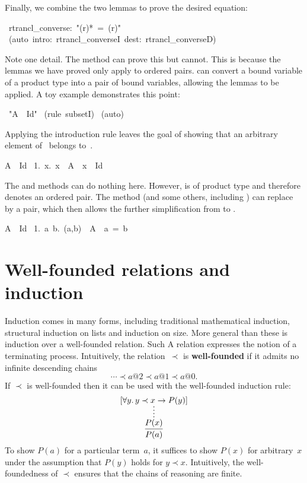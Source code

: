 Finally, we combine the two lemmas to prove the desired equation: 
\begin{isabelle}
\ rtrancl_converse:\ "(r){\isacharcircum}*\ =\ (r\isacharcircum{*}){\isacharcircum}"\isanewline
{}\ (auto\ intro:\
rtrancl_converseI\ dest:\
rtrancl_converseD)\isanewline
{}
\end{isabelle}

Note one detail. The {} method can prove this but
{} cannot. 
This is because the
lemmas we have proved only apply  to ordered pairs. {} can
convert a bound variable of  a product type into a pair of bound variables,
allowing the lemmas  to be applied.  A toy example demonstrates this
point:
\begin{isabelle}
\ "A\ \isasymsubseteq\ Id"\isanewline
{}\ (rule\ subsetI)\isanewline
\isacommand{apply}\ (auto)
\end{isabelle}
Applying the introduction rule  leaves the goal of showing
that an arbitrary element of~ belongs to~.
\begin{isabelle}
A\ \isasymsubseteq\ Id\isanewline
\ 1.\ {\isasymAnd}x.\ x\ \isasymin\ A\ \isasymLongrightarrow\ x\ \isasymin\ Id
\end{isabelle}
The \isa{simp} and \isa{blast} methods can do nothing here.  However,
\isa{x} is of product type and therefore denotes an ordered pair.  The
\isa{auto} method (and some others, including \isa{clarify})
can replace
\isa{x} by a pair, which then allows the further simplification from
 to .
\begin{isabelle}
A\ \isasymsubseteq\ Id\isanewline
\ 1.\ {\isasymAnd}a\ b.\ (a,b)\ \isasymin\ A\ \isasymLongrightarrow\ a\ =\ b
\end{isabelle}



\section{Well-founded relations and induction}
\label{sec:Well-founded}

Induction comes in many forms, including traditional mathematical 
induction, structural induction on lists and induction on size. 
More general than these is induction over a well-founded relation. 
Such A relation expresses the notion of a terminating process. 
Intuitively, the relation~$\prec$ is \textbf{well-founded} if it admits no
infinite  descending chains
\[ \cdots \prec a@2 \prec a@1 \prec a@0. \]
If $\prec$ is well-founded then it can be used with the well-founded 
induction rule: 
\[ \infer{P(a)}{\infer*{P(x)}{[\forall y.\, y\prec x \imp P(y)]}} \]
To show $P(a)$ for a particular term~$a$, it suffices to show $P(x)$ for
arbitrary~$x$ under the assumption that $P(y)$ holds for $y\prec x$. 
Intuitively, the well-foundedness of $\prec$ ensures that the chains of
reasoning are finite.


